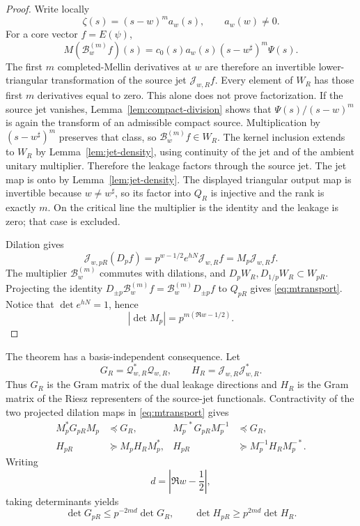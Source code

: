 \documentclass[11pt]{article}
\theoremstyle{remark}
\begin{document}
\begin{proof}
Write locally
\[
 \zeta(s)=(s-w)^m a_w(s),\qquad a_w(w)\ne0.
\]
For a core vector $f=E(\psi)$,
\[
 M(\mathcal B_w^{(m)}f)(s)
 =c_0(s)a_w(s)(s-w^\sharp)^m\Psi(s).
\]
The first $m$ completed-Mellin derivatives at $w$ are therefore an invertible lower-triangular transformation of the source jet $\mathcal J_{w,R}f$. Every element of $W_R$ has those first $m$ derivatives equal to zero.
This alone does not prove factorization. If the source jet vanishes,
Lemma~\ref{lem:compact-division} shows that
$\Psi(s)/(s-w)^m$ is again the transform of an admissible compact source.
Multiplication by $(s-w^\sharp)^m$ preserves that class, so
$\mathcal B_w^{(m)}f\in W_R$. The kernel inclusion extends to $W_R$ by
Lemma~\ref{lem:jet-density}, using continuity of the jet and of the ambient
unitary multiplier. Therefore the leakage factors through the source jet.
The jet map is onto by Lemma~\ref{lem:jet-density}. The displayed triangular
output map is invertible because $w\ne w^\sharp$, so its factor into $Q_R$
is injective and the rank is exactly $m$. On the critical line the
multiplier is the identity and the leakage is zero; that case is excluded.

Dilation gives
\[
 \mathcal J_{w,pR}(D_pf)=p^{w-1/2}e^{hN}\mathcal J_{w,R}f=M_p\mathcal J_{w,R}f.
\]
The multiplier $\mathcal B_w^{(m)}$ commutes with dilations, and $D_pW_R,D_{1/p}W_R\subset W_{pR}$. Projecting the identity $D_{\pm p}\mathcal B_w^{(m)}f=\mathcal B_w^{(m)}D_{\pm p}f$ to $Q_{pR}$ gives \eqref{eq:mtransport}.  Notice that $\det e^{hN}=1$, hence
\[
 |\det M_p|=p^{m(\Re w-1/2)}.
\]
\end{proof}

The theorem has a basis-independent consequence.  Let
\[
 G_R=\mathcal Q_{w,R}^*\mathcal Q_{w,R},
 \qquad
 H_R=\mathcal J_{w,R}\mathcal J_{w,R}^*.
\]
Thus $G_R$ is the Gram matrix of the dual leakage directions and $H_R$ is the Gram matrix of the Riesz representers of the source-jet functionals.  Contractivity of the two projected dilation maps in \eqref{eq:mtransport} gives
\begin{align}
 M_p^*G_{pR}M_p&\preceq G_R,
 &M_p^{-*}G_{pR}M_p^{-1}&\preceq G_R,\label{eq:Gineq}\\
 H_{pR}&\succeq M_pH_RM_p^*,
 &H_{pR}&\succeq M_p^{-1}H_RM_p^{-*}.\label{eq:Hineq}
\end{align}
Writing
\[
 d=\left|\Re w-\frac12\right|,
\]
taking determinants yields
\begin{equation}\label{eq:det-one-sided}
 \det G_{pR}\le p^{-2md}\det G_R,
 \qquad
 \det H_{pR}\ge p^{2md}\det H_R.
\end{equation}
\end{document}
